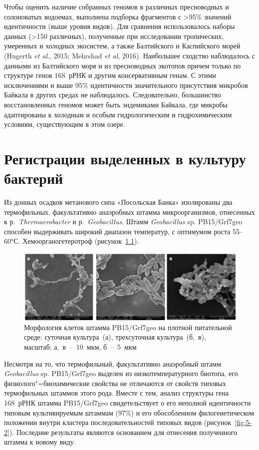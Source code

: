 \documentclass[a4paper,12pt,openany,final]{extreport}
\newcommand\MA[2]{{\sffamily\color{red}\hsmash{$\uparrow$}%
  \smash{\toplap{#1}{\scriptsize\bfseries #2}}}}
\newcommand*{\hl}[1]{%
\tikz[baseline]\node[rectangle, fill=yellow, rounded corners, inner sep=0.3mm,anchor=base]{#1};%
}
\def\oldcaption{} \let\oldcaption=\caption
\def\caption{\stepcounter{captionsnum}\oldcaption}
\providecommand\hl[1]{}
\renewcommand\hl[1]{#1}
\renewcommand\MA[2]{}
\begin{document}
Чтобы оценить наличие собранных геномов в различных пресноводных и солоноватых водоемах, выполнена подборка фрагментов с \textgreater{}95\% значений идентичности (выше уровня видов). Для сравнения использовалось наборы данных (\textgreater{}150 различных), полученные при исследовании тропических, умеренных и холодных экосистем, а также Балтийского и Каспийского морей (Hugerth \textit{et al}., 2015; Mehrshad \textit{et al}, 2016). Наибольшее сходство наблюдалось с данными из Балтийского моря и из пресноводных экотопов причем только по структуре генов 16S~рРНК и другим консервативным генам. С этими исключениями и выше 95\% идентичности значительного присутствия микробов Байкала в других средах не наблюдалось. Следовательно, большинство восстановленных геномов может быть эндемиками Байкала, где микробы адаптированы к холодным и особым гидрологическим и гидрохимическим условиям, существующим в этом озере.

\chapter{Регистрации выделенных в культуру бактерий}\label{chap:4}

Из донных осадков метанового сипа «Посольская Банка» изолированы два термофильных,\MA{r}{разнородные <<прилагательные>>? (запятая)} факультативно анаэробных штамма микроорганизмов, отнесенных к р.~\emph{Thermaerobacter} и р.~\emph{Geobacillus}. Штамм \emph{Geobacillus} sp. PB15/Grf7geo способен выдерживать широкий диапазон температур, с оптимумом роста 55--60°С. \hl{Хемоорганогетеротроф} (рисунок~\ref{fig:5-1}).

\begin{figure}[hb]\centering
\includegraphics[width=0.9\linewidth]{media/image12.png}

\caption{Морфология клеток штамма PB15/Grf7geo на плотной питательной среде: суточная культура~(а), трехсуточная культура~(б,~в), масштаб: а,~в~--~10~мкм, б~--~5~мкм}\label{fig:5-1}
\end{figure}

Несмотря на то, что термофильный, факультативно анаэробный штамм \emph{Geobacillus} sp. PB15/Grf7geo выделен из низкотемпературного биотопа, его физиолого"=биохимические свойства не отличаются от свойств типовых термофильных штаммов этого рода. Вместе с тем, анализ структуры гена 16S~рРНК штамма PB15/Grf7geo свидетельствует о его неполной идентичности типовым культивируемым штаммам (97\%) и его обособленном филогенетическом положении внутри кластера последовательностей типовых видов (рисунок~\ref{fig:5-2}). Последние результаты являются основанием для отнесения полученного штамма к новому виду.
\end{document}
